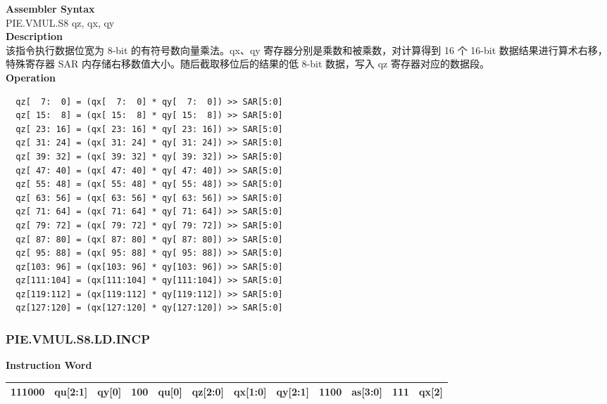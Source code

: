 \textbf{Assembler Syntax} \\
PIE.VMUL.S8 qz, qx, qy \\
\textbf{Description} \\
该指令执行数据位宽为 8-bit 的有符号数向量乘法。qx、qy 寄存器分别是乘数和被乘数，对计算得到 16 个 16-bit 数据结果进行算术右移，特殊寄存器 SAR 内存储右移数值大小。随后截取移位后的结果的低 8-bit 数据，写入 qz 寄存器对应的数据段。\\
\textbf{Operation}
\begin{lstlisting}
  qz[  7:  0] = (qx[  7:  0] * qy[  7:  0]) >> SAR[5:0]
  qz[ 15:  8] = (qx[ 15:  8] * qy[ 15:  8]) >> SAR[5:0]
  qz[ 23: 16] = (qx[ 23: 16] * qy[ 23: 16]) >> SAR[5:0]
  qz[ 31: 24] = (qx[ 31: 24] * qy[ 31: 24]) >> SAR[5:0]
  qz[ 39: 32] = (qx[ 39: 32] * qy[ 39: 32]) >> SAR[5:0]
  qz[ 47: 40] = (qx[ 47: 40] * qy[ 47: 40]) >> SAR[5:0]
  qz[ 55: 48] = (qx[ 55: 48] * qy[ 55: 48]) >> SAR[5:0]
  qz[ 63: 56] = (qx[ 63: 56] * qy[ 63: 56]) >> SAR[5:0]
  qz[ 71: 64] = (qx[ 71: 64] * qy[ 71: 64]) >> SAR[5:0]
  qz[ 79: 72] = (qx[ 79: 72] * qy[ 79: 72]) >> SAR[5:0]
  qz[ 87: 80] = (qx[ 87: 80] * qy[ 87: 80]) >> SAR[5:0]
  qz[ 95: 88] = (qx[ 95: 88] * qy[ 95: 88]) >> SAR[5:0]
  qz[103: 96] = (qx[103: 96] * qy[103: 96]) >> SAR[5:0]
  qz[111:104] = (qx[111:104] * qy[111:104]) >> SAR[5:0]
  qz[119:112] = (qx[119:112] * qy[119:112]) >> SAR[5:0]
  qz[127:120] = (qx[127:120] * qy[127:120]) >> SAR[5:0]
\end{lstlisting}

\newpage
\subsubsection{PIE.VMUL.S8.LD.INCP}\label{instruction:PIEVMULS8LDINCP}
\setlength\tabcolsep{6pt}
\textbf{Instruction Word} \\
\begin{tabular}{|c|c|c|c|c|c|c|c|c|c|c|c|}
	\hline
	111000 & qu[2:1] & qy[0] & 100 & qu[0] & qz[2:0] & qx[1:0] & qy[2:1] & 1100 & as[3:0] & 111 & qx[2] \\
	\hline
\end{tabular}

